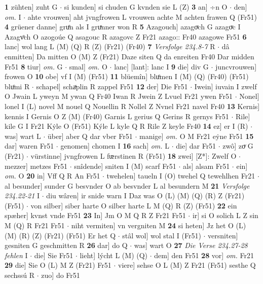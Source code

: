\documentclass[8pt,a4paper,notitlepage]{article}
\begin{document}
\begin{table}[ht]
\begin{minipage}[t]{0.5\linewidth}
\textbf{1} zühten] zuht G  $\cdot$ si kunden] si chuden G kvnden sie L (Z) \textbf{3} an] ÷n O  $\cdot$ den] \textit{om.} I  $\cdot$ ahte vrouwen] aht jvngfrowen L vrouwen achte M achten frawen Q (Fr51) \textbf{4} grüener danne] gruͤn als I gruͯnner won R \textbf{5} Azagouch] azagoͮch G azagoͮc I Azagvͦch O azogoúe Q asagouc R azagovc Z Fr21 azago:: Fr40 azagowe Fr51 \textbf{6} lanc] wol lang L (M) (Q) R (Z) (Fr21) (Fr40) \textbf{7} \textit{Versfolge 234.8-7} R   $\cdot$ dâ enmitten] Da mitten O (M) Z (Fr21) Daze siten Q da enreiten Fr40 Dar midden Fr51 \textbf{8} tiur] \textit{om.} G  $\cdot$ smal] \textit{om.} O  $\cdot$ lanc] [lant]: lanc I \textbf{9} die] div G  $\cdot$ juncvrouwen] frowen O \textbf{10} obe] vf I (M) (Fr51) \textbf{11} blüemîn] bluͦmen I (M) (Q) (Fr40) (Fr51) bluͦmi R  $\cdot$ schapel] schaͯplin R zappel Fr51 \textbf{12} der] Die Fr51  $\cdot$ Iwein] iuvain I zwelf O Jwain L yweyn M ywan Q Fr40 Iwan R Jwein Z Lvuel Fr21 ywen Fr51  $\cdot$ Nonel] lonel I (L) novel M nouel Q Nouellin R Nollel Z Nvnel Fr21 navel Fr40 \textbf{13} Kernis] kennis I Gernis O Z (M) (Fr40) Garnis L gerius Q Gerins R gernys Fr51  $\cdot$ Rile] kile G I Fr21 Kẏle O (Fr51) Kýle L kyle Q R Rile Z keyle Fr40 \textbf{14} ez] er I (R)  $\cdot$ was] wart L  $\cdot$ über] aber Q dar vber Fr51  $\cdot$ manige] \textit{om.} O M Fr21 eẏne Fr51 \textbf{15} dar] waren Fr51  $\cdot$ genomen] chomen I \textbf{16} sach] \textit{om.} L  $\cdot$ die] dar Fr51  $\cdot$ zwô] zoͮ G (Fr21)  $\cdot$ vürstinne] jvngfrowen L fᵫrstinen R (Fr51) \textbf{18} zwei] [Z*]: Zwelf O  $\cdot$ mezzer] metzes Fr51  $\cdot$ snîdende] sniten I (M) scarf Fr51  $\cdot$ als] alsam Fr51  $\cdot$ ein] \textit{om.} O \textbf{20} in] Vff Q R An Fr51  $\cdot$ twehelen] taueln I (O) twehel Q tewehlhen Fr21  $\cdot$ al besunder] sunder G besvnder O ab besvnder L al besundern M \textbf{21} \textit{Versfolge 234.22-21} I   $\cdot$ diu wâren] ir snide warn I Daz was O (L) (M) (Q) (R) Z (Fr21) (Fr51)  $\cdot$ von silber] siber harte O silber harte L M (Q) R (Z) (Fr51) \textbf{22} ein spæher] kvnst vnde Fr51 \textbf{23} In] Jm O M Q R Z Fr21 Fr51  $\cdot$ ir] si O solich L Z sin M (Q) R Fr21 Fr51  $\cdot$ niht vermiten] vn vergniten M \textbf{24} si heten] Jz het O (L) (M) (R) (Z) (Fr21) (Fr51) Er het Q  $\cdot$ stâl wol] wol stal I (Fr51)  $\cdot$ versniten] gesniten G geschmitten R \textbf{26} dar] do Q  $\cdot$ was] wart O \textbf{27} \textit{Die Verse 234.27-28 fehlen} I   $\cdot$ die] Sie Fr51  $\cdot$ lieht] lýcht L (M) (Q)  $\cdot$ dem] den Fr51 \textbf{28} vor] \textit{om.} Fr21 \textbf{29} die] Sie O (L) M Z (Fr21) Fr51  $\cdot$ viere] sehse O L (M) Z Fr21 (Fr51) sesthe Q sechssú R  $\cdot$ zuo] do Fr51 \newline

\end{minipage}
\end{table}
\end{document}
